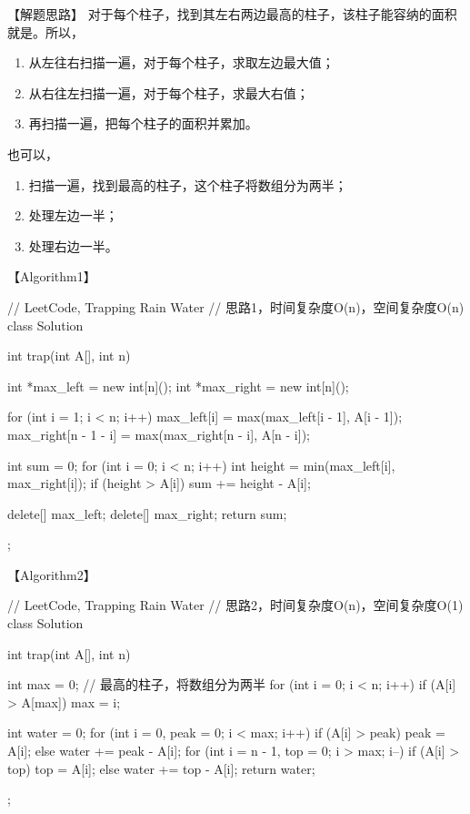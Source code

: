 【解题思路】
对于每个柱子，找到其左右两边最高的柱子，该柱子能容纳的面积就是。所以，
\begin{enumerate}
	\item 从左往右扫描一遍，对于每个柱子，求取左边最大值；
	\item 从右往左扫描一遍，对于每个柱子，求最大右值；
	\item 再扫描一遍，把每个柱子的面积并累加。
\end{enumerate}

也可以，
\begin{enumerate}
	\item 扫描一遍，找到最高的柱子，这个柱子将数组分为两半；
	\item 处理左边一半；
	\item 处理右边一半。
\end{enumerate}


【Algorithm1】
\begin{Code}
	// LeetCode, Trapping Rain Water
	// 思路1，时间复杂度O(n)，空间复杂度O(n)
	class Solution {
		int trap(int A[], int n) {
			int *max_left = new int[n]();
			int *max_right = new int[n]();
			
			for (int i = 1; i < n; i++) {
				max_left[i] = max(max_left[i - 1], A[i - 1]);
				max_right[n - 1 - i] = max(max_right[n - i], A[n - i]);
			}
			
			int sum = 0;
			for (int i = 0; i < n; i++) {
				int height = min(max_left[i], max_right[i]);
				if (height > A[i])
					sum += height - A[i];
			}
			
			delete[] max_left;
			delete[] max_right;
			return sum;
		}
	};
\end{Code}

【Algorithm2】
\begin{Code}
	// LeetCode, Trapping Rain Water
	// 思路2，时间复杂度O(n)，空间复杂度O(1)
	class Solution {
		int trap(int A[], int n) {
			int max = 0; // 最高的柱子，将数组分为两半
			for (int i = 0; i < n; i++)
				if (A[i] > A[max]) max = i;
			
			int water = 0;
			for (int i = 0, peak = 0; i < max; i++)
				if (A[i] > peak) peak = A[i];
				else water += peak - A[i];
			for (int i = n - 1, top = 0; i > max; i--)
				if (A[i] > top) top = A[i];
				else water += top - A[i];
			return water;
		}
	};
\end{Code}


